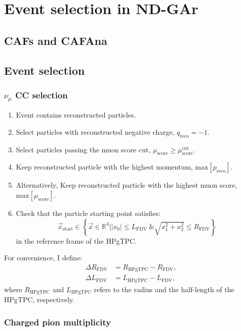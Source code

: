 \chapter{Event selection in ND-GAr}
\label{chapter:gar_selection}

\section{CAFs and CAFAna}

\section{Event selection}

\subsection[\texorpdfstring{$\nu_{\mu}$}{numu} CC selection]{\boldmath\texorpdfstring{$\nu_{\mu}$}{numu} CC selection}

\begin{enumerate}
    \item Event contains reconstructed particles.
    \item Select particles with reconstructed negative charge, $q_{\mathrm{reco}} = -1$.
    \item Select particles passing the muon score cut, $\mu_{\mathrm{score}} \geq \mu_{\mathrm{score}}^{\mathrm{cut}}$.
    \item Keep reconstructed particle with the highest momentum, $\mathrm{max}\left[p_{\mathrm{reco}}\right]$.
    \item Alternatively, Keep reconstructed particle with the highest muon score, $\mathrm{max}\left[\mu_{\mathrm{score}}\right]$.
    \item Check that the particle starting point satisfies:
    \begin{equation}
        \vec{x}_{\mathrm{start}} \in \left\{\vec{x} \in \mathbb{R}^{3} | |x_{0}| \leq L_{\mathrm{FDV}} ~ \& \sqrt{x_{1}^{2}+x_{2}^{2}} \leq R_{\mathrm{FDV}}\right\}
    \end{equation}
    in the reference frame of the HPgTPC.
\end{enumerate}

For convenience, I define:
\begin{equation}
    \begin{split}
        \Delta R_{\mathrm{FDV}} &= R_{\mathrm{HPgTPC}} - R_{\mathrm{FDV}}, \\
        \Delta L_{\mathrm{FDV}} &= L_{\mathrm{HPgTPC}} - L_{\mathrm{FDV}},
    \end{split}
\end{equation}
where $R_{\mathrm{HPgTPC}}$ and $L_{\mathrm{HPgTPC}}$ refers to the radius and the half-length of the HPgTPC, respectively.

\subsection{Charged pion multiplicity}